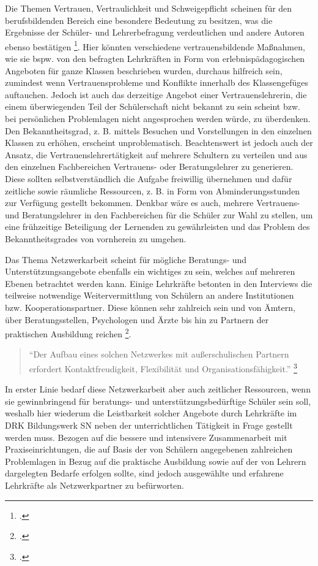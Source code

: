 Die Themen Vertrauen, Vertraulichkeit und Schweigepflicht scheinen für den berufsbildenden Bereich eine besondere Bedeutung zu besitzen, was die Ergebnisse der Schüler- und Lehrerbefragung verdeutlichen und andere Autoren ebenso bestätigen \footcite[vgl.][49]{Essers2012}. Hier könnten verschiedene vertrauensbildende Maßnahmen, wie sie bspw. von den befragten Lehrkräften in Form von erlebnispädagogischen Angeboten für ganze Klassen beschrieben wurden, durchaus hilfreich sein, zumindest wenn Vertrauensprobleme und Konflikte innerhalb des Klassengefüges auftauchen. Jedoch ist auch das derzeitige Angebot einer Vertrauenslehrerin, die einem überwiegenden Teil der Schülerschaft nicht bekannt zu sein scheint bzw. bei persönlichen Problemlagen nicht angesprochen werden würde, zu überdenken. Den Bekanntheitsgrad, z. B. mittels Besuchen und Vorstellungen in den einzelnen Klassen zu erhöhen, erscheint unproblematisch. Beachtenswert ist jedoch auch der Ansatz, die Vertrauenslehrertätigkeit auf mehrere Schultern zu verteilen und aus den einzelnen Fachbereichen Vertrauens- oder Beratungslehrer zu generieren. Diese sollten selbstverständlich die Aufgabe freiwillig übernehmen und dafür zeitliche sowie räumliche Ressourcen, z. B. in Form von Abminderungsstunden zur Verfügung gestellt bekommen. Denkbar wäre es auch, mehrere Vertrauens- und Beratungslehrer in den Fachbereichen für die Schüler zur Wahl zu stellen, um eine frühzeitige Beteiligung der Lernenden zu gewährleisten und das Problem des Bekanntheitsgrades von vornherein zu umgehen. 

Das Thema Netzwerkarbeit scheint für mögliche Beratungs- und Unterstützungsangebote ebenfalls ein wichtiges zu sein, welches auf mehreren Ebenen betrachtet werden kann. Einige Lehrkräfte betonten in den Interviews die teilweise notwendige Weitervermittlung von Schülern an andere Institutionen bzw. Kooperationspartner. Diese können sehr zahlreich sein und von Ämtern, über Beratungsstellen, Psychologen und Ärzte bis hin zu Partnern der praktischen Ausbildung reichen \footcites[vgl.][49ff]{Essers2012}[vgl.][21]{NiedersaechsischesKultusministerium2004}.

\begin{quotation}
\noindent
"`Der Aufbau eines solchen Netzwerkes mit außerschulischen Partnern erfordert Kontaktfreudigkeit, Flexibilität und Organisationsfähigkeit."' \footcite[21]{NiedersaechsischesKultusministerium2004}
\end{quotation}

In erster Linie bedarf diese Netzwerkarbeit aber auch zeitlicher Ressourcen, wenn sie gewinnbringend für beratungs- und unterstützungsbedürftige Schüler sein soll, weshalb hier wiederum die Leistbarkeit solcher Angebote durch Lehrkräfte im DRK Bildungswerk SN neben der unterrichtlichen Tätigkeit in Frage gestellt werden muss. Bezogen auf die bessere und intensivere Zusammenarbeit mit Praxiseinrichtungen, die auf Basis der von Schülern angegebenen zahlreichen Problemlagen in Bezug auf die praktische Ausbildung sowie auf der von Lehrern dargelegten Bedarfe erfolgen sollte, sind jedoch ausgewählte und erfahrene Lehrkräfte als  Netzwerkpartner zu befürworten.

